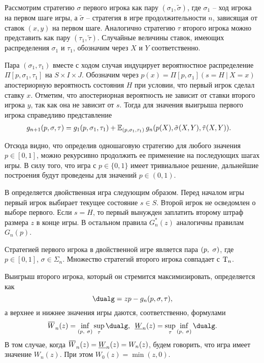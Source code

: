 Рассмотрим стратегию $\sigma$ первого игрока как пару $(\sigma_1, \tilde{\sigma})$, где $\sigma_1$ -- ход игрока на первом шаге игры, а $\tilde{\sigma}$ -- стратегия в игре продолжительности $n$, зависящая от ставок $(x, y)$ на первом шаге.
Аналогично стратегию $\tau$ второго игрока можно представить как пару $(\tau_1, \tilde{\tau})$.
Случайные величины ставок, имеющих распределения $\sigma_1$ и $\tau_1$, обозначим через $X$ и $Y$ соответственно.

Пара $(\sigma_1, \tau_1)$ вместе с ходом случая индуцирует вероятностное распределение $\Pi[p, \sigma_1, \tau_1]$ на $S \times I \times J$.
Обозначим через
$
  p(x) = \Pi[p, \sigma_1](s = H\ |\ X = x)
$
апостериорную вероятность состояния $H$ при условии, что первый игрок сделал ставку $x$.
Отметим, что апостериорная вероятность не зависит от ставки второго игрока $y$, так как она не зависит от $s$.
Тогда для значения выигрыша первого игрока справедливо представление
\begin{align*}
  g_{n+1}(p, \sigma, \tau) 
  &= 
    g_1(p, \sigma_1, \tau_1) +
    \operatorname{\mathbb{E}}_{( p, \sigma_1, \tau_1 )}
    g_n(p(X), \tilde{\sigma}(X, Y), \tilde{\tau}(X, Y)).
\end{align*}

Отсюда видно, что определив одношаговую стратегию для любого значения $p \in [0, 1]$, можно рекурсивно продолжить ее применение на последующих шагах игры.
В силу того, что игра с $p \in \{0, 1\}$ имеет тривиальное решение, дальнейшие построения будут проведены для значений $p \in (0, 1)$.

В  определяется двойственная игра следующим образом.
Перед началом игры первый игрок выбирает текущее состояние $s \in S$.
Второй игрок не осведомлен о выборе первого.
Если $s = H$, то первый вынужден заплатить второму штраф размера $z$ в конце игры.
В остальном правила $G^*_n(z)$ аналогичны правилам $G_n(p)$.

Стратегией первого игрока в двойственной игре является пара $(p,\ \sigma)$, где $p \in [0, 1]$, $\sigma \in \Sigma_n$.
Множество стратегий второго игрока совпадает с $\mathrm{T}_n$.

Выигрыш второго игрока, который он стремится максимизировать, определяется как
\begin{equation*}
  \dualg = z p - g_n(p, \sigma, \tau),
\end{equation*}
а верхнее и нижнее значения игры даются, соответственно, формулами
\begin{equation*}
  \HW{n}(z) = \inf_{\dualFPS} \sup_\tau \dualg, \enskip
  \LW{n}(z) = \sup_\tau \inf_{\dualFPS} \dualg.
\end{equation*}
В том случае, когда $\HW{n}(z) = \LW{n}(z) = W_n(z)$, будем говорить, что игра имеет значение $W_n(z)$.
При этом $W_0(z) = \min(z, 0)$.

